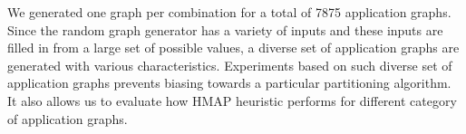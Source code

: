 {\setlength{\parindent}{0cm}
We generated one graph per combination for a total of 7875 application
graphs. Since the random graph generator has a variety of inputs and these
inputs are filled in from a large set of possible values, a diverse set of
application graphs are generated with various characteristics. Experiments
based on such diverse set of application graphs prevents biasing towards a
particular partitioning algorithm. It also allows us to evaluate how HMAP
heuristic performs for different category of application graphs.
}



